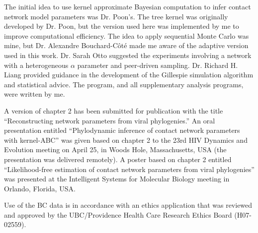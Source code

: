 The initial idea to use kernel approximate Bayesian computation to infer
contact network model parameters was Dr. Poon's. The tree kernel was originally
developed by Dr. Poon, but the version used here was implemented by me to
improve computational efficiency. The idea to apply sequential Monte Carlo was
mine, but Dr. Alexandre Bouchard-C\^ot\'e made me aware of the adaptive version
used in this work. Dr. Sarah Otto suggested the experiments involving a network
with a heterogeneous $\alpha$ parameter and peer-driven sampling. Dr. Richard
H. Liang provided guidance in the development of the Gillespie simulation
algorithm and statistical advice. The  program, and all
supplementary analysis programs, were written by me.

A version of chapter 2 has been submitted for publication with the title
``Reconstructing network parameters from viral phylogenies.'' An oral
presentation entitled ``Phylodynamic inference of contact network parameters
with kernel-ABC'' was given based on chapter 2 to the 23rd HIV Dynamics and
Evolution meeting on April 25, in Woods Hole, Massachusetts, USA (the
presentation was delivered remotely). A poster based on chapter 2 entitled
``Likelihood-free estimation of contact network parameters from viral
phylogenies'' was presented at the Intelligent Systems for Molecular Biology
meeting in Orlando, Florida, USA.

Use of the BC data is in accordance with an ethics application that was
reviewed and approved by the UBC/Providence Health Care Research Ethics Board
(H07-02559).
